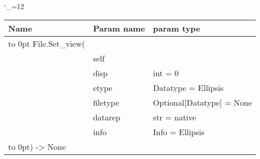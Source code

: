 \begingroup \catcode`\_=12 \tt
\begin{tabular}{lll}
\toprule
\textrm{Name}&\textrm{Param name}&\textrm{param type}\\
\midrule
\hbox to 0pt {File.Set_view(\hss}\\
& self\\
& disp & int = 0\\
& etype & Datatype = Ellipsis\\
& filetype & Optional[Datatype] = None\\
& datarep & str = native\\
& info & Info = Ellipsis\\
\hbox to 0pt{) -> None\hss}\\
\bottomrule
\end{tabular}
\endgroup

